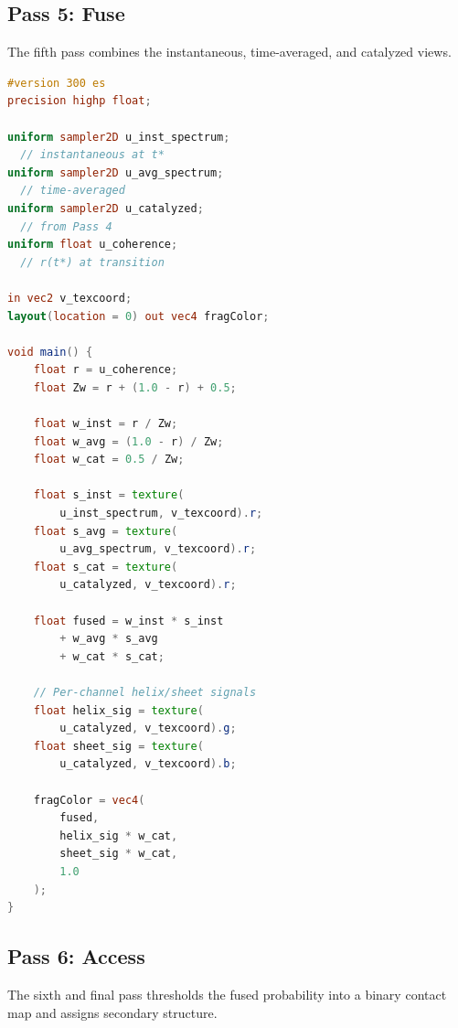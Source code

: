 \documentclass[11pt,twocolumn,a4paper]{article}
\theoremstyle{definition}
\theoremstyle{remark}
\begin{document}
\subsection{Pass 5: Fuse}

The fifth pass combines the instantaneous, time-averaged, and catalyzed views.

\begin{lstlisting}[language=GLSL,caption={Pass 5: Fuse (multi-modal combination)},label=lst:pass5]
#version 300 es
precision highp float;

uniform sampler2D u_inst_spectrum;
  // instantaneous at t*
uniform sampler2D u_avg_spectrum;
  // time-averaged
uniform sampler2D u_catalyzed;
  // from Pass 4
uniform float u_coherence;
  // r(t*) at transition

in vec2 v_texcoord;
layout(location = 0) out vec4 fragColor;

void main() {
    float r = u_coherence;
    float Zw = r + (1.0 - r) + 0.5;

    float w_inst = r / Zw;
    float w_avg = (1.0 - r) / Zw;
    float w_cat = 0.5 / Zw;

    float s_inst = texture(
        u_inst_spectrum, v_texcoord).r;
    float s_avg = texture(
        u_avg_spectrum, v_texcoord).r;
    float s_cat = texture(
        u_catalyzed, v_texcoord).r;

    float fused = w_inst * s_inst
        + w_avg * s_avg
        + w_cat * s_cat;

    // Per-channel helix/sheet signals
    float helix_sig = texture(
        u_catalyzed, v_texcoord).g;
    float sheet_sig = texture(
        u_catalyzed, v_texcoord).b;

    fragColor = vec4(
        fused,
        helix_sig * w_cat,
        sheet_sig * w_cat,
        1.0
    );
}
\end{lstlisting}

\subsection{Pass 6: Access}

The sixth and final pass thresholds the fused probability into a binary contact map and assigns secondary structure.
\end{document}
